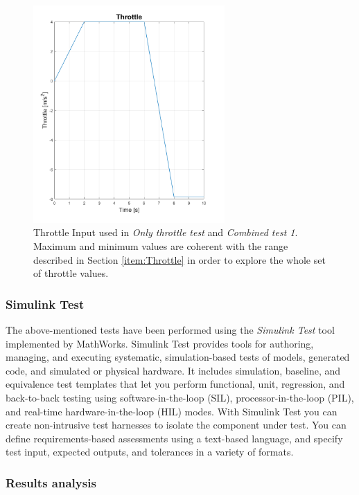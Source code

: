 \begin{figure}[H]
    \centering
    \includegraphics[width=0.65\textwidth]{Figures/InputThrottle.png}
    \caption{Throttle Input used in \textit{Only throttle test} and \textit{Combined test 1}. Maximum and minimum values are coherent with the range described in Section \ref{item:Throttle} in order to explore the whole set of throttle values.}
      \label{fig:InputThrottle}
\end{figure}






\subsubsection{Simulink Test}
The above-mentioned tests have been performed using the \textit{Simulink Test} tool implemented by MathWorks. Simulink Test provides tools for authoring, managing, and executing systematic, simulation-based tests of models, generated code, and simulated or physical hardware. It includes simulation, baseline, and equivalence test templates that let you perform functional, unit, regression, and back-to-back testing using software-in-the-loop (SIL), processor-in-the-loop (PIL), and real-time hardware-in-the-loop (HIL) modes. With Simulink Test you can create non-intrusive test harnesses to isolate the component under test. You can define requirements-based assessments using a text-based language, and specify test input, expected outputs, and tolerances in a variety of formats. \cite{SimulinkTest}

\subsubsection{Results analysis}

